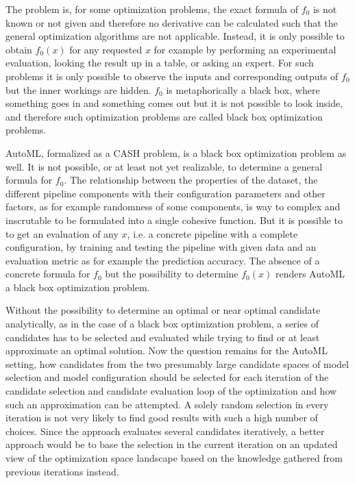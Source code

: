 The problem is, for some optimization problems, the exact formula of $f_0$ is not known or not given and therefore no derivative can be calculated such that the general optimization algorithms are not applicable.
Instead, it is only possible to obtain $f_0(x)$ for any requested $x$ for example by performing an experimental evaluation, looking the result up in a table, or asking an expert.
For such problems it is only possible to observe the inputs and corresponding outputs of $f_0$ but the inner workings are hidden.
$f_0$ is metaphorically a black box, where something goes in and something comes out but it is not possible to look inside, and therefore such optimization problems are called black box optimization problems.

AutoML, formalized as a CASH problem, is a black box optimization problem as well.
It is not possible, or at least not yet realizable, to determine a general formula for $f_0$.
The relationship between the properties of the dataset, the different pipeline components with their configuration parameters and other factors, as for example randomness of some components, is way to complex and inscrutable to be formulated into a single cohesive function.\newline
But it is possible to to get an evaluation of any $x$, i.e. a concrete pipeline with a complete configuration, by training and testing the pipeline with given data and an evaluation metric as for example the prediction accuracy.
The absence of a concrete formula for $f_0$ but the possibility to determine $f_0(x)$ renders AutoML a black box optimization problem.

Without the possibility to determine an optimal or near optimal candidate analytically, as in the case of a black box optimization problem, a series of candidates has to be selected and evaluated while trying to find or at least approximate an optimal solution.
Now the question remains for the AutoML setting, how candidates from the two presumably large candidate spaces of model selection and model configuration should be selected for each iteration of the candidate selection and candidate evaluation loop of the optimization and how such an approximation can be attempted.\newline
A solely random selection in every iteration is not very likely to find good results with such a high number of choices.
Since the approach evaluates several candidates iteratively, a better approach would be to base the selection in the current iteration on an updated view of the optimization space landscape based on the knowledge gathered from previous iterations instead.

